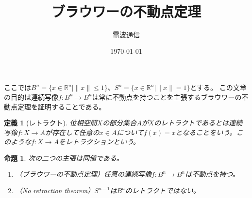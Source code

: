 \documentclass[leqno]{jsarticle}
\title{ブラウワーの不動点定理}
\author{電波通信}
\date{\today}
\newtheorem{prop}[thm]{命題}
\newtheorem{df}[thm]{定義}
\newcommand{\rr}{\mathbb{R}}
\begin{document}
\maketitle
ここでは$B^n=\{x\in \rr^n\mid \|x\|\le 1\}$、$S^{n}=\{x\in \rr^n\mid \|x\|= 1\}$とする。
この文章の目的は連続写像$f:B^n\to B^n$は常に不動点を持つことを主張するブラウワーの不動点定理を証明することである。
\begin{df}[レトラクト]
位相空間$X$の部分集合$A$が$X$のレトラクトであるとは連続写像$f:X\to A$が存在して任意の$x\in A$について$f(x)=x$となることをいう。このような$f:X\to A$をレトラクションという。
\end{df}

\begin{prop}
次の二つの主張は同値である。
\begin{enumerate}
\item （ブラウワーの不動点定理）任意の連続写像$f:B^n\to B^n$は不動点を持つ。
\item （No retraction theorem）$S^{n-1}$は$B^n$のレトラクトではない。
\end{enumerate}
\end{prop}
\end{document}
